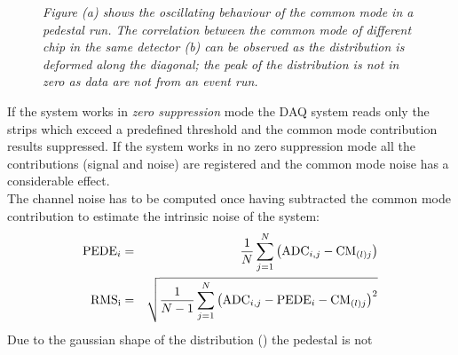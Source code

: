 \begin{figure}[!htbp]
  \centering 
  \quad
  \caption{\it Figure (a) shows the oscillating behaviour of the common mode in
    a pedestal run. The correlation between the common mode of
    different chip in the same detector (b) can be observed as the distribution is
    deformed along the diagonal; the peak of the distribution is
    not in zero as data are not from an event run.}
\end{figure}
If the system works in {\it zero suppression} mode the DAQ system reads only the
strips which exceed a predefined threshold and the common mode contribution
results suppressed. If the system works in no zero suppression mode all the
contributions (signal and noise) are registered and the common mode noise has a
considerable effect.\\
The channel noise has to be computed once having subtracted the common mode
contribution to estimate the intrinsic noise of the system:
\begin{eqnarray}
{\rm PEDE}_i &=& \frac{1}{N}\sum_{j=1}^N \left({\rm ADC}_{i,j} - {\rm CM}_{(l)j}\right)\\
{\rm RMS}_{\rm i} &=& \sqrt{\frac{1}{N-1}\sum_{j=1}^N \left({\rm ADC}_{i,j} - {\rm
                      PEDE}_{i}- {\rm CM}_{(l)j} \right)^2}\label{eq:rms_cm_sub}
\end{eqnarray}
Due to the gaussian shape of the distribution () the pedestal is not
